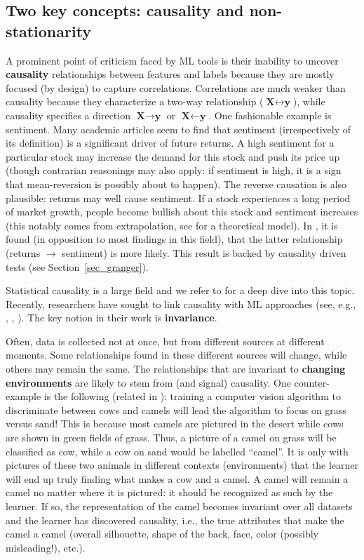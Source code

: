 \subsection{Two key concepts: causality and non-stationarity}

A prominent point of criticism faced by ML tools is their inability to uncover \textbf{causality} relationships between features and labels because they are mostly focused (by design) to capture correlations. Correlations are much weaker than causality because they characterize a two-way relationship ($\textbf{X}\leftrightarrow \textbf{y}$), while causality specifies a direction $\textbf{X}\rightarrow \textbf{y}$ or $\textbf{X}\leftarrow \textbf{y}$. One fashionable example is sentiment. Many academic articles seem to find that sentiment (irrespectively of its definition) is a significant driver of future returns. A high sentiment for a particular stock may increase the demand for this stock and push its price up (though contrarian reasonings may also apply: if sentiment is high, it is a sign that mean-reversion is possibly about to happen). The reverse causation is also plausible: returns may well cause sentiment. If a stock experiences a long period of market growth, people become bullish about this stock and sentiment increases (this notably comes from extrapolation, see \cite{barberis2015x} for a theoretical model). In \cite{coqueret2018economic}, it is found (in opposition to most findings in this field), that the latter relationship (returns $\rightarrow$ sentiment) is more likely. This result is backed by causality driven tests (see Section~\ref{sec_granger}).

Statistical causality is a large field and we refer to \cite{pearl2009causality} for a deep dive into this topic. Recently, researchers have sought to link causality with ML approaches (see, e.g., \cite{peters2017elements}, \cite{heinze2018invariant}, \cite{arjovsky2019invariant}). The key notion in their work is \textbf{invariance}.

Often, data is collected not at once, but from different sources at different moments. Some relationships found in these different sources will change, while others may remain the same. The relationships that are invariant to \textbf{changing environments} are likely to stem from (and signal) causality. One counter-example is the following (related in \cite{beery2018recognition}): training a computer vision algorithm to discriminate between cows and camels will lead the algorithm to focus on grass versus sand! This is because most camels are pictured in the desert while cows are shown in green fields of grass. Thus, a picture of a camel on grass will be classified as cow, while a cow on sand would be labelled ``camel''. It is only with pictures of these two animals in different contexts (environments) that the learner will end up truly finding what makes a cow and a camel. A camel will remain a camel no matter where it is pictured: it should be recognized as such by the learner. If so, the representation of the camel becomes invariant over all datasets and the learner has discovered causality, i.e., the true attributes that make the camel a camel (overall silhouette, shape of the back, face, color (possibly misleading!), etc.).

